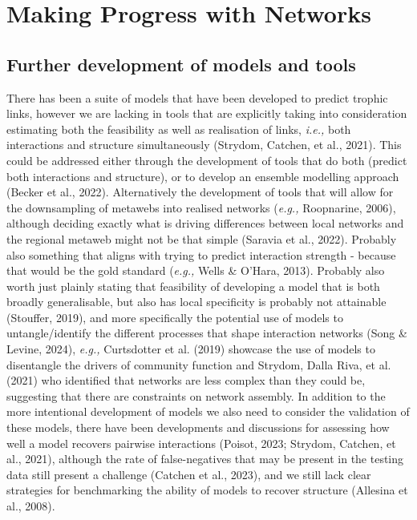 \documentclass[
]{article}
\begin{document}
\section{Making Progress with
Networks}\label{making-progress-with-networks}

\subsection{Further development of models and
tools}\label{further-development-of-models-and-tools}

There has been a suite of models that have been developed to predict
trophic links, however we are lacking in tools that are explicitly
taking into consideration estimating both the feasibility as well as
realisation of links, \emph{i.e.,} both interactions and structure
simultaneously (Strydom, Catchen, et al., 2021). This could be addressed
either through the development of tools that do both (predict both
interactions and structure), or to develop an ensemble modelling
approach (Becker et al., 2022). Alternatively the development of tools
that will allow for the downsampling of metawebs into realised networks
(\emph{e.g.,} Roopnarine, 2006), although deciding exactly what is
driving differences between local networks and the regional metaweb
might not be that simple (Saravia et al., 2022). Probably also something
that aligns with trying to predict interaction strength - because that
would be the gold standard (\emph{e.g.,} Wells \& O'Hara, 2013).
Probably also worth just plainly stating that feasibility of developing
a model that is both broadly generalisable, but also has local
specificity is probably not attainable (Stouffer, 2019), and more
specifically the potential use of models to untangle/identify the
different processes that shape interaction networks (Song \& Levine,
2024), \emph{e.g.,} Curtsdotter et al. (2019) showcase the use of models
to disentangle the drivers of community function and Strydom, Dalla
Riva, et al. (2021) who identified that networks are less complex than
they could be, suggesting that there are constraints on network
assembly. In addition to the more intentional development of models we
also need to consider the validation of these models, there have been
developments and discussions for assessing how well a model recovers
pairwise interactions (Poisot, 2023; Strydom, Catchen, et al., 2021),
although the rate of false-negatives that may be present in the testing
data still present a challenge (Catchen et al., 2023), and we still lack
clear strategies for benchmarking the ability of models to recover
structure (Allesina et al., 2008).
\end{document}
